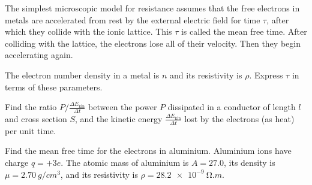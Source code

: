 \documentclass[../TST.tex]{subfiles}
\begin{document}
\begin{pproblem}
The simplest microscopic model for resistance assumes that the free electrons in metals are accelerated from rest by the external electric field for time $\tau$, after which they collide with the ionic lattice. This $\tau$ is called the mean free time. After colliding with the lattice, the electrons lose all of their velocity. Then they begin accelerating again.
\begin{subpart}
	\item The electron number density in a metal is $n$ and its resistivity is $\rho$. Express $\tau$ in terms of these parameters. 
	\item Find the ratio $P/\frac{\Delta E_\mathrm{kin}}{\Delta t}$ between the power $P$ dissipated in a conductor of length $l$ and cross section $S$, and the kinetic energy $\frac{\Delta E_\mathrm{kin}}{\Delta t}$ lost by the electrons (as heat) per unit time. 
	\item Find the mean free time for the electrons in aluminium. Aluminium ions have charge $q=+3e$. The atomic mass of aluminium is $A=27.0$, its density is $\mu=\qty{2.70}{g/cm^3}$, and its resistivity is $\rho=\qty{28.2e-9}{\ohm.m}$.
\end{subpart}
\end{pproblem}
\end{document}
